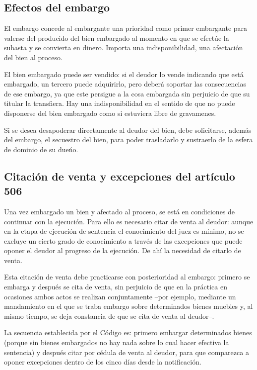 \documentclass[12pt,oneside]{book}
\begin{document}
\subsection{Efectos del embargo}

El embargo concede al embargante una prioridad como primer embargante para valerse del producido del bien embargado al momento en que se efect\'ue la subasta y se convierta en dinero. Importa una indisponibilidad, una afectaci\'on del bien al proceso.

\begin{note}
El bien embargado puede ser vendido: si el deudor lo vende indicando que est\'a embargado, un tercero puede adquirirlo, pero deber\'a soportar las consecuencias de ese embargo, ya que este persigue a la cosa embargada sin perjuicio de que su titular la transfiera. Hay una indisponibilidad en el sentido de que no puede disponerse del bien embargado como si estuviera libre de gravamenes.
\end{note}

Si se desea desapoderar directamente al deudor del bien, debe solicitarse, adem\'as del embargo, el secuestro del bien, para poder trasladarlo y sustraerlo de la esfera de dominio de su due\'no.

\subsection{Citaci\'on de venta y excepciones del art\'iculo 506}

Una vez embargado un bien y afectado al proceso, se est\'a en condiciones de continuar con la ejecuci\'on. Para ello es necesario citar de venta al deudor: aunque en la etapa de ejecuci\'on de sentencia el conocimiento del juez es m\'inimo, no se excluye un cierto grado de conocimiento a trav\'es de las excepciones que puede oponer el deudor al progreso de la ejecuci\'on. De ah\'i la necesidad de citarlo de venta.

Esta citaci\'on de venta debe practicarse con posterioridad al embargo: primero se embarga y despu\'es se cita de venta, sin perjuicio de que en la pr\'actica en ocasiones ambos actos se realizan conjuntamente --por ejemplo, mediante un mandamiento en el que se traba embargo sobre determinados bienes muebles y, al mismo tiempo, se deja constancia de que se cita de venta al deudor--.

\begin{important}
La secuencia establecida por el C\'odigo es: primero embargar determinados bienes (porque sin bienes embargados no hay nada sobre lo cual hacer efectiva la sentencia) y despu\'es citar por c\'edula de venta al deudor, para que comparezca a oponer excepciones dentro de los cinco d\'ias desde la notificaci\'on.
\end{important}
\end{document}
